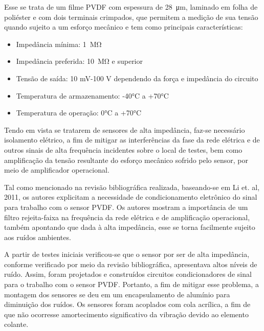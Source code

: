 \documentclass[
	12pt,				
	oneside,			
	a4paper,			
	english,			
	brazil,			
	]{abntex2ppgsi}
\begin{document}
Esse se trata de um filme PVDF com espessura de \SI{28}{\micro\meter}, laminado em folha de poliéster e com dois terminais crimpados, que permitem a medição de sua tensão quando sujeito a um esforço mecânico e tem como principais características: 

\begin{itemize}
	\item Impedância mínima: \SI{1}{\mega\ohm}
	\item Impedância preferida: \SI{10}{\mega\ohm} e superior
	\item Tensão de saída: 10 mV-100 V dependendo da força e impedância do circuito
	\item Temperatura de armazenamento: -40°C a +70°C 
	\item Temperatura de operação: 0°C a +70°C
\end{itemize}

Tendo em vista se tratarem de sensores de alta impedância, faz-se necessário isolamento elétrico, a fim de mitigar as interferências da fase da rede elétrica e de outros sinais de alta frequência incidentes sobre o local de testes, bem como amplificação da tensão resultante do esforço mecânico sofrido pelo sensor, por meio de amplificador operacional. 

Tal como mencionado na revisão bibliográfica realizada, baseando-se em Li et. al, 2011, os autores explicitam a necessidade de condicionamento eletrônico do sinal para trabalho com o sensor PVDF. Os autores mostram a importância de um filtro rejeita-faixa na frequência da rede elétrica e de amplificação operacional, também apontando que dada à alta impedância, esse se torna facilmente sujeito aos ruídos ambientes. 

A partir de testes iniciais verificou-se que o sensor por ser de alta impedância, conforme verificado por meio da revisão bibliográfica, apresentava altos níveis de ruído. Assim, foram projetados e construídos circuitos condicionadores de sinal para o trabalho com o sensor PVDF. Portanto, a fim de mitigar esse problema, a montagem dos sensores se deu em um encapsulamento de alumínio para diminuição dos ruídos. Os sensores foram acoplados com cola acrílica, a fim de que não ocorresse amortecimento significativo da vibração devido ao elemento colante.
\end{document}
